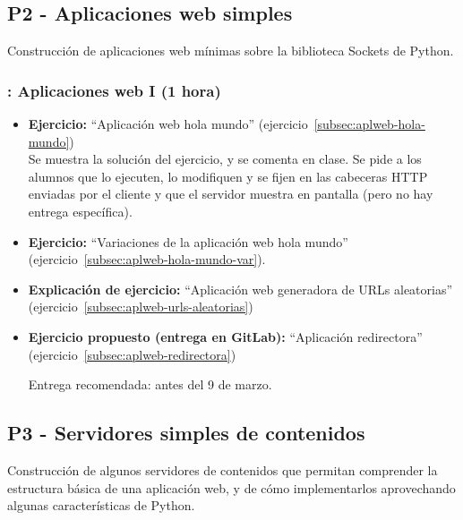 \documentclass[a4paper,12pt]{article}
\begin{document}
\subsection{P2 - Aplicaciones web simples}


Construcción de aplicaciones web mínimas sobre la biblioteca Sockets de Python.


\subsubsection{\martesD: Aplicaciones web I (1 hora)}
\label{cal:martesDb}

\begin{itemize}
 \item \textbf{Ejercicio:} ``Aplicación web hola mundo'' (ejercicio~\ref{subsec:aplweb-hola-mundo}) \\
   Se muestra la solución del ejercicio, y se comenta en clase. Se pide a los alumnos que lo ejecuten, lo modifiquen y se fijen en las cabeceras HTTP enviadas por el cliente y que el servidor muestra en pantalla (pero no hay entrega específica).
 \item \textbf{Ejercicio:} ``Variaciones de la aplicación web hola mundo'' (ejercicio~\ref{subsec:aplweb-hola-mundo-var}).
\item \textbf{Explicación de ejercicio:} ``Aplicación web generadora de URLs aleatorias'' (ejercicio~\ref{subsec:aplweb-urls-aleatorias})
\item \textbf{Ejercicio propuesto (entrega en GitLab):} ``Aplicación redirectora'' (ejercicio~\ref{subsec:aplweb-redirectora})


   Entrega recomendada: antes del 9 de marzo.
\end{itemize}


\subsection{P3 - Servidores simples de contenidos}

Construcción de algunos servidores de contenidos que permitan comprender la estructura básica de una aplicación web, y de cómo implementarlos aprovechando algunas características de Python.
\end{document}
